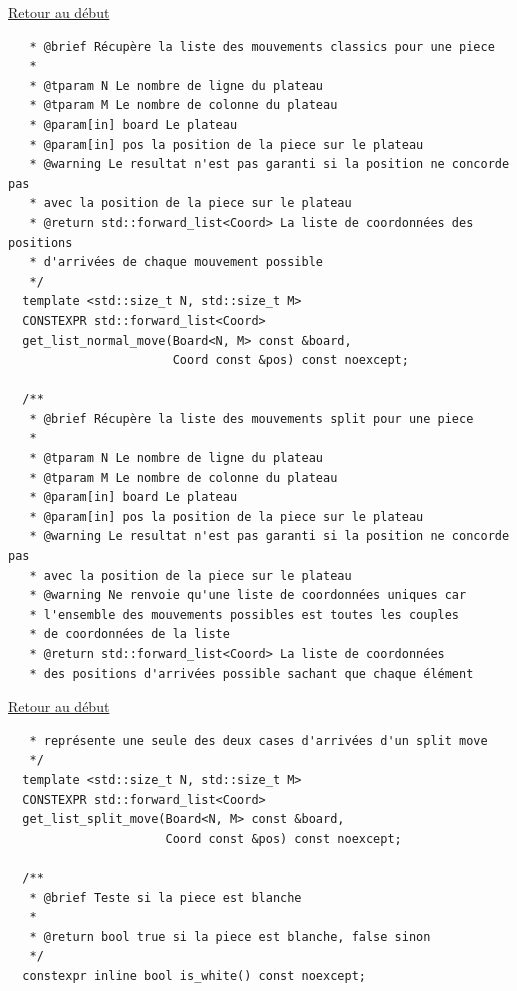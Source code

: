 {\begin{frame}[fragile]
\hyperlink{conclusion}{Retour au début}\newline
\begin{verbatim}
   * @brief Récupère la liste des mouvements classics pour une piece
   *
   * @tparam N Le nombre de ligne du plateau
   * @tparam M Le nombre de colonne du plateau
   * @param[in] board Le plateau
   * @param[in] pos la position de la piece sur le plateau
   * @warning Le resultat n'est pas garanti si la position ne concorde pas
   * avec la position de la piece sur le plateau
   * @return std::forward_list<Coord> La liste de coordonnées des positions
   * d'arrivées de chaque mouvement possible
   */
  template <std::size_t N, std::size_t M>
  CONSTEXPR std::forward_list<Coord>
  get_list_normal_move(Board<N, M> const &board,
                       Coord const &pos) const noexcept;

  /**
   * @brief Récupère la liste des mouvements split pour une piece
   *
   * @tparam N Le nombre de ligne du plateau
   * @tparam M Le nombre de colonne du plateau
   * @param[in] board Le plateau
   * @param[in] pos la position de la piece sur le plateau
   * @warning Le resultat n'est pas garanti si la position ne concorde pas
   * avec la position de la piece sur le plateau
   * @warning Ne renvoie qu'une liste de coordonnées uniques car
   * l'ensemble des mouvements possibles est toutes les couples
   * de coordonnées de la liste
   * @return std::forward_list<Coord> La liste de coordonnées
   * des positions d'arrivées possible sachant que chaque élément
\end{verbatim}
\end{frame}

\begin{frame}[fragile]
\hyperlink{conclusion}{Retour au début}\newline
\begin{verbatim}
   * représente une seule des deux cases d'arrivées d'un split move
   */
  template <std::size_t N, std::size_t M>
  CONSTEXPR std::forward_list<Coord>
  get_list_split_move(Board<N, M> const &board,
                      Coord const &pos) const noexcept;

  /**
   * @brief Teste si la piece est blanche
   *
   * @return bool true si la piece est blanche, false sinon
   */
  constexpr inline bool is_white() const noexcept;


\end{verbatim}
\end{frame}}
